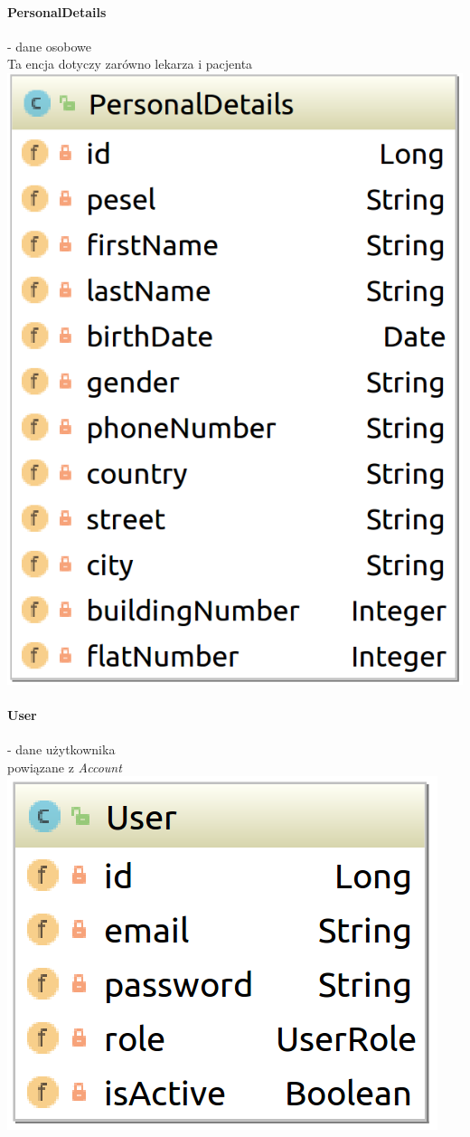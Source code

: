 \documentclass[polish,12pt]{aghthesis}
\begin{document}
    \paragraph{PersonalDetails} - dane osobowe \\
    Ta encja dotyczy zarówno lekarza i pacjenta \\
    \includegraphics[width=\textwidth]{PersonalDetails}
    \paragraph{User} - dane użytkownika \\
    powiązane z \emph{Account} \\
    \includegraphics[width=\textwidth]{User}
\end{document}

